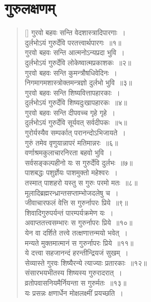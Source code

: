 \documentclass[twoside,12pt,notitlepage]{book}
\begin{document}
\section {गुरुलक्षणम्}
\begin{verse}[\versewidth]
गुरवो बहवः सन्ति वेदशास्त्रादिपारगाः~।\\[-6pt]
दुर्लभोऽयं गुरुर्देवि परतत्त्वार्थपारगः~॥१॥\footA \\
गुरवो बहवः सन्ति आत्मनोऽन्यप्रदा भुवि~।\\[-6pt]
दुर्लभोऽयं गुरुर्देवि लोकेष्वात्मप्रकाशकः~॥२॥\\
गुरवो बहवः सन्ति कुमन्त्रौषधिवेदिनः~।\\[-6pt]
निगमागमशास्त्रोक्तमन्त्रज्ञो  दुर्लभो भुवि~॥३॥\footA \\
गुरवो बहवः सन्ति शिष्यवित्तापहारकाः~।\\[-6pt]
दुर्लभोऽयं गुरुर्देवि शिष्यदुःखापहारकः~॥४॥\\
गुरवो बहवः सन्ति दीपवच्च गृहे गृहे~।\\[-6pt]
दुर्लभोऽयं गुरुर्देवि सूर्यवत् सर्वदीपकः~॥५॥\\
गुरोर्यस्यैव सम्पर्कात् परानन्दोऽभिजायते~।\\[-6pt]
गुरुं तमेव वृणुयान्नापरं मतिमान्नरः~॥६॥\footA \\
वर्णाश्रमकुलाचारनिरता बहवो भुवि~।\\[-6pt]
सर्वसङ्कल्पहीनो यः स गुरुर्देवि दुर्लभः~॥७॥\footA \\
पाशबद्धः पशुर्ज्ञेयः पाशमुक्तो महेश्वरः~।\\[-6pt]
तस्मात् पाशहरो यस्तु स गुरुः परमो मतः~॥८॥\footA \\ 
मूलादिब्रह्मरन्ध्रान्तसप्ताम्भोजदलेषु च~।\\[-6pt]
जीवाचारफलं वेत्ति स गुरुर्नापरः प्रिये~॥९॥\footA \\
शिवादिगुरुपर्यन्तं पारम्पर्यक्रमेण यः~।\\[-6pt]
अवाप्ततत्त्वसम्भारः स गुरुर्नापरः प्रिये~॥१०॥\footA \\
येन वा दर्शिते तत्त्वे तत्क्षणात्तन्मयो भवेत्~।\\[-6pt]
मन्यते मुक्तमात्मानं स गुरुर्नापरः प्रिये~॥११॥\\
ये दत्त्वा सहजानन्दं हरन्तीन्द्रियजं सुखम्~।\\[-6pt]
सेव्यास्ते गुरवः शिष्यैरन्ये त्याज्याः प्रतारकाः~॥१२॥\footA \\
संसारभयभीतस्य शिष्यस्य गुरुरादरात्~।\\[-6pt]
व्रतोपवासनियमैर्नियन्ता स गुरुर्मतः~॥१३॥\\
यः प्रसन्नः क्षणार्धेन मोक्षलक्ष्मीं प्रयच्छति~।\\[-6pt]

\end{verse}
\end{document}
